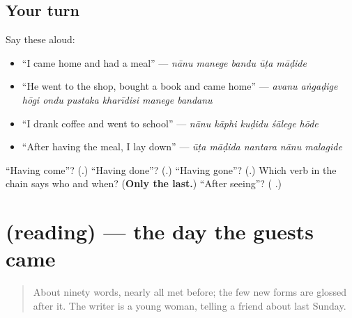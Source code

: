 \subsection*{Your turn}
Say these aloud:

\begin{itemize}
\raggedright
  \item \textquotedblleft{}I came home and had a meal\textquotedblright{} — \emph{nānu manege bandu ūṭa māḍide}
  \item \textquotedblleft{}He went to the shop, bought a book and came home\textquotedblright{} — \emph{avanu aṅgaḍige hōgi ondu pustaka kharīdisi manege bandanu}
  \item \textquotedblleft{}I drank coffee and went to school\textquotedblright{} — \emph{nānu kāphi kuḍidu śālege hōde}
  \item \textquotedblleft{}After having the meal, I lay down\textquotedblright{} — \emph{ūṭa māḍida nantara nānu malagide}
\end{itemize}

\begin{tcolorbox}[breakable,colback=teal!4,colframe=teal!35!black,title={Before you move on}]
\textquotedblleft{}Having come\textquotedblright{}? (\textbf{}.) \textquotedblleft{}Having done\textquotedblright{}? (\textbf{}.) \textquotedblleft{}Having gone\textquotedblright{}? (\textbf{}.) Which verb in the chain says who and when? (\textbf{Only the last.}) \textquotedblleft{}After seeing\textquotedblright{}? (\textbf{ }.)
\end{tcolorbox}
\section[(reading)]{(reading) — the day the guests came}

\label{lesson:KA-C310-atithigalu}



\begin{quote}
About ninety words, nearly all met before; the few new forms are glossed after it. The writer is a young woman, telling a friend about last Sunday.
\end{quote}

